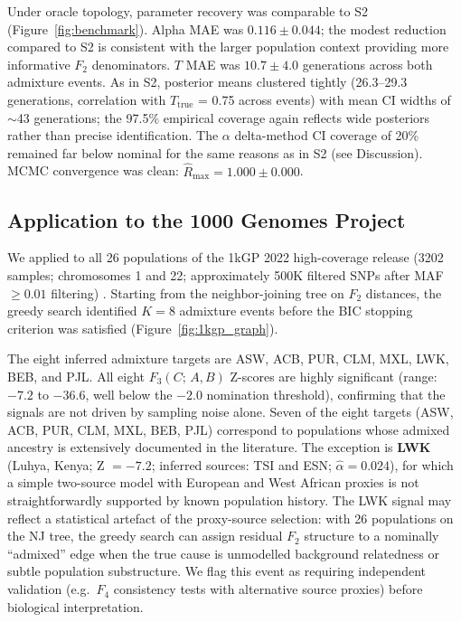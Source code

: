 Under oracle topology, parameter recovery was comparable to S2
(Figure~\ref{fig:benchmark}).
Alpha MAE was $0.116 \pm 0.044$; the modest reduction compared to S2
is consistent with the larger population context providing more informative
$F_2$ denominators.
$T$ MAE was $10.7 \pm 4.0$ generations across both admixture events.
As in S2, posterior means clustered tightly (26.3--29.3 generations,
correlation with $T_{\mathrm{true}}$ = 0.75 across events) with mean CI
widths of $\sim$43 generations; the 97.5\% empirical coverage again
reflects wide posteriors rather than precise identification.
The $\alpha$ delta-method CI coverage of 20\% remained far below nominal for
the same reasons as in S2 (see Discussion).
MCMC convergence was clean: $\hat{R}_{\max} = 1.000 \pm 0.000$.



\subsection*{Application to the 1000 Genomes Project}

We applied \hapgraph{} to all 26 populations of the 1kGP 2022 high-coverage
release (3202 samples; chromosomes 1 and 22; approximately 500K filtered SNPs
after MAF $\geq 0.01$ filtering) \citep{ByrskaBishop2022,1KGP2015}.
Starting from the neighbor-joining tree on $F_2$ distances, the greedy search
identified $K=8$ admixture events before the BIC stopping criterion was
satisfied (Figure~\ref{fig:1kgp_graph}).

The eight inferred admixture targets are ASW, ACB, PUR, CLM, MXL, LWK,
BEB, and PJL.
All eight $F_3(C;\,A,B)$ Z-scores are highly significant (range:
$-7.2$ to $-36.6$, well below the $-2.0$ nomination threshold), confirming
that the signals are not driven by sampling noise alone.
Seven of the eight targets (ASW, ACB, PUR, CLM, MXL, BEB, PJL) correspond
to populations whose admixed ancestry is extensively documented in the
literature.
The exception is \textbf{LWK} (Luhya, Kenya; Z $= -7.2$; inferred sources:
TSI and ESN; $\hat{\alpha} = 0.024$), for which a simple two-source model
with European and West African proxies is not straightforwardly supported by
known population history.
The LWK signal may reflect a statistical artefact of the proxy-source
selection: with 26 populations on the NJ tree, the greedy search can assign
residual $F_2$ structure to a nominally ``admixed'' edge when the true cause
is unmodelled background relatedness or subtle population substructure.
We flag this event as requiring independent validation (e.g.\ $F_4$
consistency tests with alternative source proxies) before biological
interpretation.

